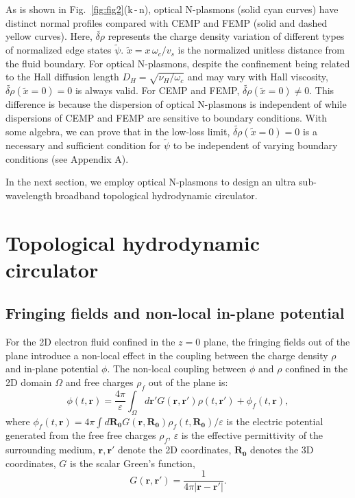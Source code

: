 \documentclass[%
reprint,
amsmath,amssymb,
aps,superscriptaddress
]{revtex4-2}
\begin{document}
As is shown in Fig.~\ref{fig:fig2}(k\,-\,n), optical N-plasmons (solid cyan curves) have distinct normal profiles compared with CEMP and FEMP (solid and dashed yellow curves). Here, $\widetilde{\delta \rho}$ represents the charge density variation of different types of normalized edge states $\tilde{\psi}$. $\tilde{x}=x\, \omega_c/v_s$ is the normalized unitless distance from the fluid boundary. For optical N-plasmons, despite the confinement being related to the Hall diffusion length $D_H=\sqrt{\nu_H/\omega_c}$ and may vary with Hall viscosity, $\widetilde{\delta \rho}(\tilde{x}=0)=0$ is always valid. For CEMP and FEMP, $\widetilde{\delta \rho}(\tilde{x}=0)\neq 0$. This difference is because the dispersion of optical N-plasmons is independent of while dispersions of CEMP and FEMP are sensitive to boundary conditions. With some algebra, we can prove that in the low-loss limit, $\widetilde{\delta \rho}(\tilde{x}=0)=0$ is a necessary and sufficient condition for $\tilde{\psi}$ to be independent of varying boundary conditions (see Appendix A). 

In the next section, we employ optical N-plasmons to design an ultra sub-wavelength broadband topological hydrodynamic circulator.

\section{Topological hydrodynamic circulator}\label{section3}

\subsection{Fringing fields and non-local in-plane potential}\label{subsection3_1}

For the 2D electron fluid confined in the $z=0$ plane, the fringing fields out of the plane introduce a non-local effect in the coupling between the charge density $\rho$ and in-plane potential $\phi$. The non-local coupling between $\phi$ and $\rho$ confined in the 2D domain $\Omega$ and free charges $\rho_f$ out of the plane is:
\begin{equation}\label{potential}
\phi(t,\mathbf{r})=\frac{4\pi}{\varepsilon} \int_{\Omega} d\mathbf{r}'G(\mathbf{r},\mathbf{r}')\rho(t,\mathbf{r}')+\phi_f(t,\mathbf{r}),
\end{equation}
where $\phi_f(t,\mathbf{r})=4\pi\int d\mathbf{R_0} G(\mathbf{r},\mathbf{R_0})\rho_f(t,\mathbf{R_0})/\varepsilon$ is the electric potential generated from the free free charges $\rho_f$, $\varepsilon$ is the effective permittivity of the surrounding medium, $\mathbf{r}, \mathbf{r'}$ denote the 2D coordinates, $\mathbf{R_0}$ denotes the 3D coordinates, $G$ is the scalar Green's function,
\begin{equation}\label{greenfunction}
G(\mathbf{r},\mathbf{r}')=\frac{1}{4\pi |\mathbf{r}-\mathbf{r}'|}.
\end{equation}
\end{document}
